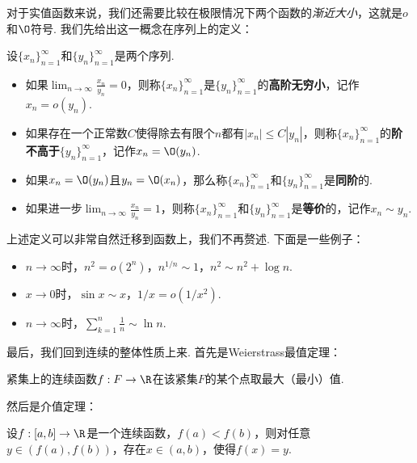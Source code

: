对于实值函数来说，我们还需要比较在极限情况下两个函数的\emph{渐近大小}，这就是$o$和$\O$符号. 我们先给出这一概念在序列上的定义：

\begin{definition}[阶，无穷小，等价]
    设$\{x_n\}_{n=1}^\infty$和$\{y_n\}_{n=1}^\infty$是两个序列. 
\begin{itemize}
    \item  如果$\lim_{n\to\infty}\frac{x_n}{y_n}=0$，则称$\{x_n\}_{n=1}^\infty$是$\{y_n\}_{n=1}^\infty$的\textbf{高阶无穷小}，记作$x_n=o(y_n)$.
    \item 如果存在一个正常数$C$使得除去有限个$n$都有$|x_n|\leq C |y_n|$，则称$\{x_n\}_{n=1}^\infty$的\textbf{阶不高于}$\{y_n\}_{n=1}^\infty$，记作$x_n=\O(y_n)$.
    \item 如果$x_n=\O(y_n)$且$y_n=\O(x_n)$，那么称$\{x_n\}_{n=1}^\infty$和$\{y_n\}_{n=1}^\infty$是\textbf{同阶}的.
    \item 如果进一步$\lim_{n\to\infty}\frac{x_n}{y_n}=1$，则称$\{x_n\}_{n=1}^\infty$和$\{y_n\}_{n=1}^\infty$是\textbf{等价}的，记作$x_n\sim y_n$.
\end{itemize}
\end{definition}

上述定义可以非常自然迁移到函数上，我们不再赘述. 下面是一些例子：

\begin{example}
\begin{itemize}
    \item $n\to\infty$时，$n^2=o(2^n)$，$n^{1/n}\sim 1$，$n^2\sim n^2+\log n$.
    \item $x\to 0$时，$\sin x\sim x$，$1/x=o(1/x^2)$. 
    \item $n\to\infty$时，$\sum_{k=1}^n\frac{1}{n}\sim\ln n$.
\end{itemize}
\end{example}

最后，我们回到连续的整体性质上来. 首先是Weierstrass最值定理：

\begin{theorem}[Weierstrass最值定理]\label{thm:weierstrass}
    紧集上的连续函数$f:F\to\R$在该紧集$F$的某个点取最大（最小）值. 
\end{theorem}

然后是介值定理：
\begin{theorem}[介值定理]\label{thm:intermediate}
    设$f:[a,b]\to\R$是一个连续函数，$f(a)<f(b)$，则对任意$y\in(f(a),f(b))$，存在$x\in(a,b)$，使得$f(x)=y$.
\end{theorem}

